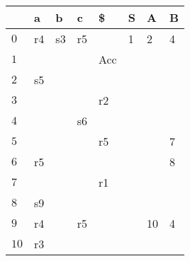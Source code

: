 \documentclass{standalone}
\providecommand\lightrule{%
	\arrayrulecolor{black!30}%
	\midrule[\lightrulewidth]%
	\arrayrulecolor{black}}
\begin{document}
	\begin{tabularx}{\textwidth}{XXXXXXXX}
         & a & b & c & \$ & S & A & B \\
        \midrule
            \(0\) & r4 & s3 & r5 & & 1 & 2 & 4
            \\ \lightrule
            \(1\) & & & & Acc & & &
            \\ \lightrule
            \(2\) & s5 & & & & & &
            \\ \lightrule
            \(3\) & & & & r2 & & &
            \\ \lightrule
            \(4\) & & & s6 & & & &
            \\ \lightrule
            \(5\) & & & & r5 & & & 7
            \\ \lightrule
            \(6\) & r5 & & & & & & 8
            \\ \lightrule
            \(7\) & & & & r1 & & &
            \\ \lightrule
            \(8\) & s9 & & & & & &
            \\ \lightrule
            \(9\) & r4 & & r5 & & & 10 & 4
            \\ \lightrule
            \(10\) & r3 & & & & & &
	\end{tabularx}
\end{document}
